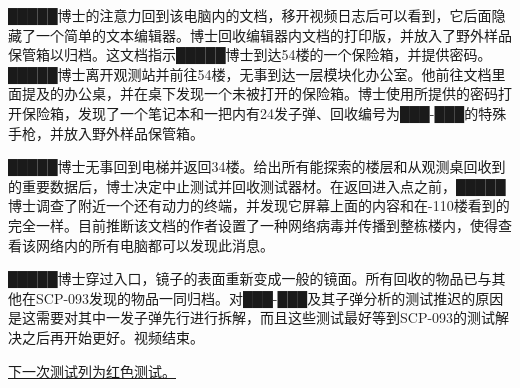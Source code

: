 \begin{scpbox}
█████博士的注意力回到该电脑内的文档，移开视频日志后可以看到，它后面隐藏了一个简单的文本编辑器。博士回收编辑器内文档的打印版，并放入了野外样品保管箱以归档。这文档指示█████博士到达54楼的一个保险箱，并提供密码。█████博士离开观测站并前往54楼，无事到达一层模块化办公室。他前往文档里面提及的办公桌，并在桌下发现一个未被打开的保险箱。博士使用所提供的密码打开保险箱，发现了一个笔记本和一把内有24发子弹、回收编号为███-███的特殊手枪，并放入野外样品保管箱。

█████博士无事回到电梯并返回34楼。给出所有能探索的楼层和从观测桌回收到的重要数据后，博士决定中止测试并回收测试器材。在返回进入点之前，█████博士调查了附近一个还有动力的终端，并发现它屏幕上面的内容和在-110楼看到的完全一样。目前推断该文档的作者设置了一种网络病毒并传播到整栋楼内，使得查看该网络内的所有电脑都可以发现此消息。

█████博士穿过入口，镜子的表面重新变成一般的镜面。所有回收的物品已与其他在SCP-093发现的物品一同归档。对███-███及其子弹分析的测试推迟的原因是这需要对其中一发子弹先行进行拆解，而且这些测试最好等到SCP-093的测试解决之后再开始更好。视频结束。

\end{scpbox}

\hyperref[sec:DOC-scp-093-red-test]{下一次测试列为红色测试。}
